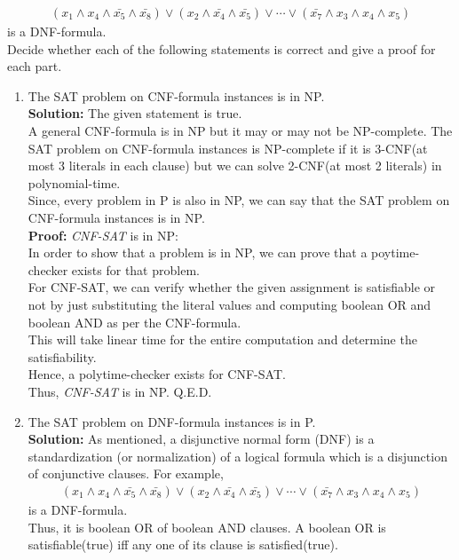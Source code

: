 \documentclass[12pt]{article}
\begin{document}
\begin{enumerate}
\begin{align*}
(x_1 \land x_4 \land \bar{x_5} \land \bar{x_8}) \lor (x_2 \land \bar{x_4} \land \bar{x_5}) \lor \cdots \lor (\bar{x_7} \land x_3 \land x_4 \land x_5)
\end{align*}
is a DNF-formula.\\
Decide whether each of the following statements is correct and give a proof for each part.
\begin{enumerate}
\item The SAT problem on CNF-formula instances is in NP.\\
\textbf{Solution:} The given statement is true.\\
A general CNF-formula is in NP but it may or may not be NP-complete.
The SAT problem on CNF-formula instances is NP-complete if it is 3-CNF(at most 3 literals in each clause) but we can solve 2-CNF(at most 2 literals) in polynomial-time.\\
Since, every problem in P is also in NP, we can say that the SAT problem on CNF-formula instances is in NP.\\
\textbf{Proof:} \textit{CNF-SAT} is in NP:\\
In order to show that a problem is in NP, we can prove that a poytime-checker exists for that problem.\\
For CNF-SAT, we can verify whether the given assignment is satisfiable or not by just substituting the literal values and computing boolean OR and boolean AND as per the CNF-formula.\\
This will take linear time for the entire computation and determine the satisfiability.\\
Hence, a polytime-checker exists for CNF-SAT.\\
Thus, \textit{CNF-SAT} is in NP. \hfill Q.E.D.
\item The SAT problem on DNF-formula instances is in P.\\
\textbf{Solution:} As mentioned, a disjunctive normal form (DNF) is a standardization (or normalization) of a logical formula which is a disjunction of conjunctive clauses. For example,
\begin{align*}
(x_1 \land x_4 \land \bar{x_5} \land \bar{x_8}) \lor (x_2 \land \bar{x_4} \land \bar{x_5}) \lor \cdots \lor (\bar{x_7} \land x_3 \land x_4 \land x_5)
\end{align*}
is a DNF-formula.\\
Thus, it is boolean OR of boolean AND clauses. A boolean OR is satisfiable(true) iff any one of its clause is satisfied(true). \\

\end{enumerate}
\end{enumerate}
\end{document}
